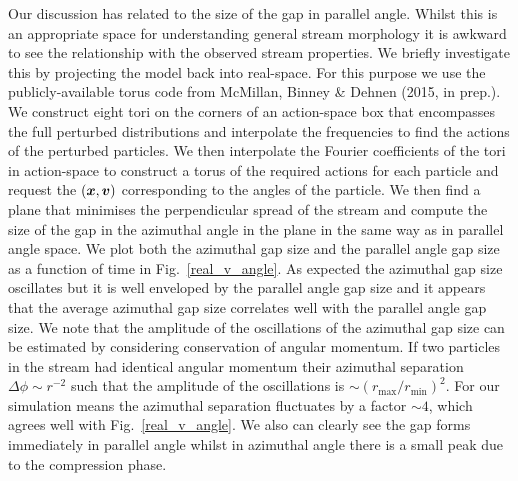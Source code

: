 \documentclass[useAMS,usenatbib,fleqn,a4paper]{mn2e}
\newcommand{\bs}[1]{\bmath{#1}}
\begin{document}
Our discussion has related to the size of the gap in parallel angle. Whilst this is an appropriate space for understanding general stream morphology it is awkward to see the relationship with the observed stream properties. We briefly investigate this by projecting the model back into real-space. For this purpose we use the publicly-available torus code from McMillan, Binney \& Dehnen (2015, in prep.). We construct eight tori on the corners of an action-space box that encompasses the full perturbed distributions and interpolate the frequencies to find the actions of the perturbed particles. We then interpolate the Fourier coefficients of the tori in action-space to construct a torus of the required actions for each particle and request the $(\bs{x},\bs{v})$ corresponding to the angles of the particle. We then find a plane that minimises the perpendicular spread of the stream and compute the size of the gap in the azimuthal angle in the plane in the same way as in parallel angle space. We plot both the azimuthal gap size and the parallel angle gap size as a function of time in Fig.~\ref{real_v_angle}. As expected the azimuthal gap size oscillates but it is well enveloped by the parallel angle gap size and it appears that the average azimuthal gap size correlates well with the parallel angle gap size. We note that the amplitude of the oscillations of the azimuthal gap size can be estimated by considering conservation of angular momentum. If two particles in the stream had identical angular momentum their azimuthal separation $\Delta\phi\sim r^{-2}$ such that the amplitude of the oscillations is $\sim(r_\mathrm{max}/r_\mathrm{min})^2$. For our simulation means the azimuthal separation fluctuates by a factor $\sim 4$, which agrees well with Fig.~\ref{real_v_angle}. We also can clearly see the gap forms immediately in parallel angle whilst in azimuthal angle there is a small peak due to the compression phase.
\end{document}
